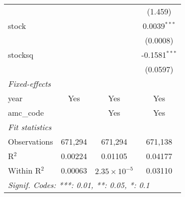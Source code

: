\begin{tabular}{lccc}
                  &                 &                       & (1.459)\\   
   stock          &                 &                       & 0.0039$^{***}$\\   
                  &                 &                       & (0.0008)\\   
   stocksq        &                 &                       & -0.1581$^{***}$\\   
                  &                 &                       & (0.0597)\\   
   \midrule
   \emph{Fixed-effects}\\
   year           & Yes             & Yes                   & Yes\\  
   amc\_code      &                 & Yes                   & Yes\\  
   \midrule
   \emph{Fit statistics}\\
   Observations   & 671,294         & 671,294               & 671,138\\  
   R$^2$          & 0.00224         & 0.01105               & 0.04177\\  
   Within R$^2$   & 0.00063         & $2.35\times 10^{-5}$  & 0.03110\\  
   \midrule \midrule
   \multicolumn{4}{l}{\emph{Signif. Codes: ***: 0.01, **: 0.05, *: 0.1}}\\
\end{tabular}
\par\endgroup


